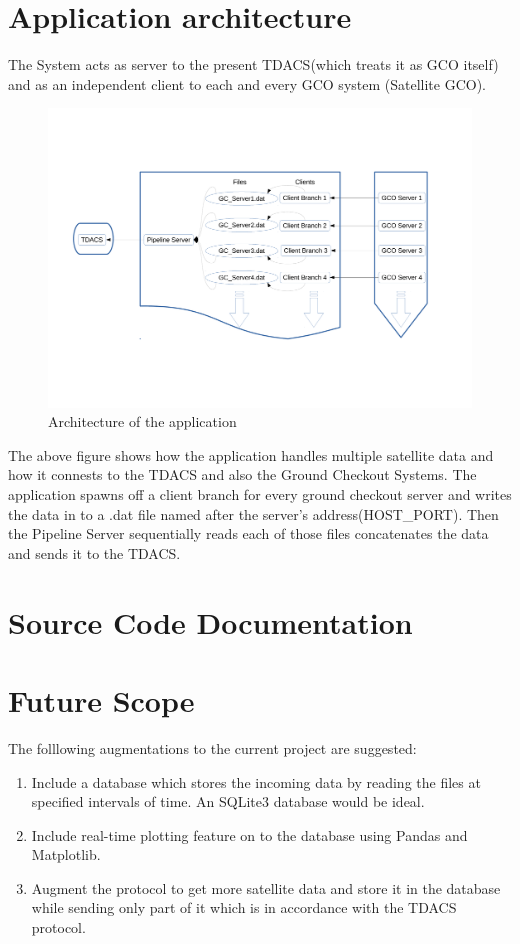 \documentclass[12pt, a4paper]{report}
\begin{document}
\chapter{Application architecture}
The System acts as server to the present TDACS(which treats it as GCO itself)
and as an independent client to each and every GCO system (Satellite GCO).

\begin{figure}[!h]
	\centering
	\includegraphics[scale=0.4]{arch.pdf}
	\caption{Architecture of the application}
\end{figure}

\par The above figure shows how the application handles multiple satellite data
and how it connests to the TDACS and also the Ground Checkout Systems. The
application spawns off a client branch for every ground checkout server and
writes the data in to a .dat file named after the server's address(HOST\_PORT).
Then the Pipeline Server sequentially reads each of those files concatenates
the data and sends it to the TDACS.

\chapter{Source Code Documentation}



\chapter{Future Scope}
\par The folllowing augmentations to the current project are suggested:
\begin{enumerate}
	\item Include a database which stores the incoming data by reading the
		files at specified intervals of time. An SQLite3 database would be
		ideal.
	\item Include real-time plotting feature on to the database using Pandas
		and Matplotlib.
	\item Augment the protocol to get more satellite data and store it in the
		database while sending only part of it which is in accordance with the
		TDACS protocol.
\end{enumerate}
\end{document}
